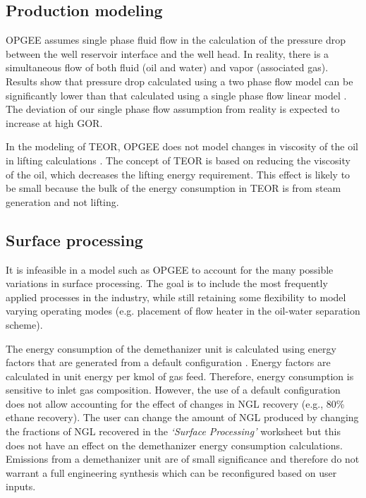 \documentclass[11pt]{report}
\newcommand{\sheet}[1]{\textit{`{#1}'}}
\begin{document}
\subsection{Production modeling}
OPGEE assumes single phase fluid flow in the calculation of the pressure drop between the well reservoir interface and the well head. In reality, there is a simultaneous flow of both fluid (oil and water) and vapor (associated gas). Results show that pressure drop calculated using a two phase flow model can be significantly lower than that calculated using a single phase flow linear model \cite{Clegg2007}. The deviation of our single phase flow assumption from reality is expected to increase at high GOR. \par

In the modeling of TEOR, OPGEE does not model changes in viscosity of the oil in lifting calculations \cite{Green1998}. The concept of TEOR is based on reducing the viscosity of the oil, which decreases the lifting energy requirement. This effect is likely to be small because the bulk of the energy consumption in TEOR is from steam generation and not lifting.\par


\subsection{Surface processing}

It is infeasible in a model such as OPGEE to account for the many possible variations in surface processing. The goal is to include the most frequently applied processes in the industry, while still retaining some flexibility to model varying operating modes (e.g. placement of flow heater in the oil-water separation scheme).\par

The energy consumption of the demethanizer unit is calculated using energy factors that are generated from a default configuration \cite{Nawaz2010}. Energy factors are calculated in unit energy per kmol of gas feed. Therefore, energy consumption is sensitive to inlet gas composition. However, the use of a default configuration does not allow accounting for the effect of changes in NGL recovery (e.g., 80\% ethane recovery). The user can change the amount of NGL produced by changing the fractions of NGL recovered in the \sheet{Surface Processing} worksheet but this does not have an effect on the demethanizer energy consumption calculations. Emissions from a demethanizer unit are of small significance and therefore do not warrant a full engineering synthesis which can be reconfigured based on user inputs.\par
\end{document}
